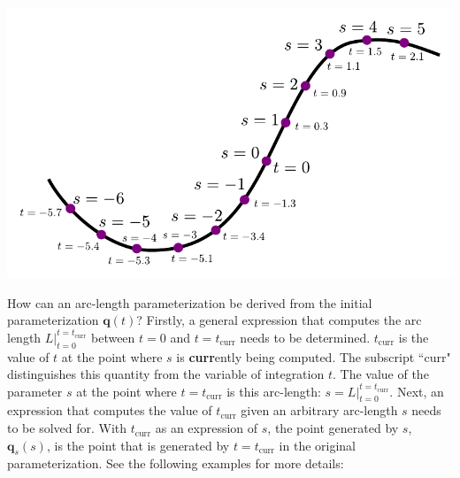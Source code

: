 \documentclass{article}
\begin{document}
\begin{center}
\includegraphics[width = \textwidth]{arc_length_parameterization}
\end{center}

How can an arc-length parameterization be derived from the initial parameterization \(\mathbf{q}(t)\)? Firstly, a general expression that computes the arc length \(L\Big|_{t = 0}^{t = t_{\text{curr}}}\) between \(t = 0\) and \(t = t_{\text{curr}}\) needs to be determined. \(t_{\text{curr}}\) is the value of \(t\) at the point where \(s\) is {\bf curr}ently being computed. The subscript ``curr" distinguishes this quantity from the variable of integration \(t\). The value of the parameter \(s\) at the point where \(t = t_{\text{curr}}\) is this arc-length: \(s = L\Big|_{t = 0}^{t = t_{\text{curr}}}\). Next, an expression that computes the value of \(t_{\text{curr}}\) given an arbitrary arc-length \(s\) needs to be solved for. With \(t_{\text{curr}}\) as an expression of \(s\), the point generated by \(s\), \(\mathbf{q}_s(s)\), is the point that is generated by \(t = t_{\text{curr}}\) in the original parameterization. See the following examples for more details:

\vspace{5mm}
\end{document}
